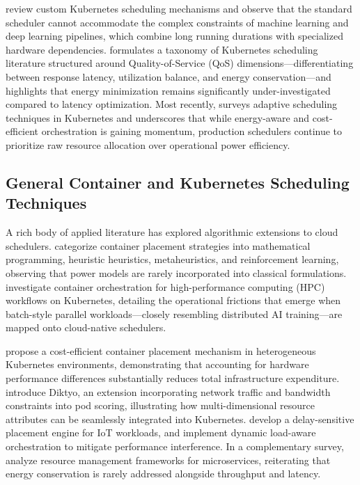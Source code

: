 \documentclass[a4paper,fleqn]{cas-dc}
\begin{document}
\citet{rejiba2022custom} review custom Kubernetes scheduling mechanisms and observe that the standard scheduler cannot accommodate the complex constraints of machine learning and deep learning pipelines, which combine long running durations with specialized hardware dependencies. \citet{carrion2022kubernetes} formulates a taxonomy of Kubernetes scheduling literature structured around Quality-of-Service (QoS) dimensions—differentiating between response latency, utilization balance, and energy conservation—and highlights that energy minimization remains significantly under-investigated compared to latency optimization. Most recently, \citet{elkafhali2026survey} surveys adaptive scheduling techniques in Kubernetes and underscores that while energy-aware and cost-efficient orchestration is gaining momentum, production schedulers continue to prioritize raw resource allocation over operational power efficiency.

\subsection{General Container and Kubernetes Scheduling Techniques}
A rich body of applied literature has explored algorithmic extensions to cloud schedulers. \citet{ahmad2022container} categorize container placement strategies into mathematical programming, heuristic heuristics, metaheuristics, and reinforcement learning, observing that power models are rarely incorporated into classical formulations. \citet{zhou2021container} investigate container orchestration for high-performance computing (HPC) workflows on Kubernetes, detailing the operational frictions that emerge when batch-style parallel workloads—closely resembling distributed AI training—are mapped onto cloud-native schedulers. 

\citet{zhong2020cost} propose a cost-efficient container placement mechanism in heterogeneous Kubernetes environments, demonstrating that accounting for hardware performance differences substantially reduces total infrastructure expenditure. \citet{santos2023diktyo} introduce Diktyo, an extension incorporating network traffic and bandwidth constraints into pod scoring, illustrating how multi-dimensional resource attributes can be seamlessly integrated into Kubernetes. \citet{lai2023delay} develop a delay-sensitive placement engine for IoT workloads, and \citet{marchese2025loadaware} implement dynamic load-aware orchestration to mitigate performance interference. In a complementary survey, \citet{alqassem2024microservices} analyze resource management frameworks for microservices, reiterating that energy conservation is rarely addressed alongside throughput and latency.
\end{document}
